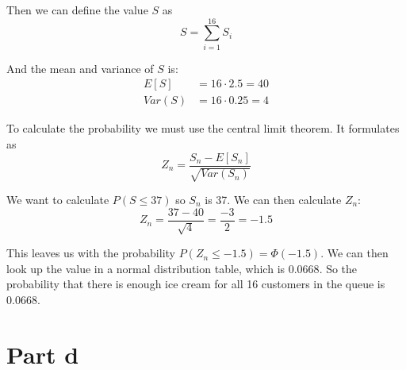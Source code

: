 Then we can define the value $S$ as
\[
	S = \sum^16_{i=1} S_i
\]

And the mean and variance of $S$ is:
\begin{align*}
	E[S]   & = 16 \cdot 2.5 = 40 \\
	Var(S) & = 16 \cdot 0.25 = 4
\end{align*}

To calculate the probability we must use the central limit theorem. It formulates as
\[
	Z_n = \frac{S_n - E[S_n]}{\sqrt{Var(S_n)}}
\]

We want to calculate $P(S\leq 37)$ so $S_n$ is 37. We can then calculate $Z_n$:
\[
	Z_n = \frac{37 - 40}{\sqrt{4}} = \frac{-3}{2} = -1.5
\]

This leaves us with the probability $P(Z_n \leq -1.5) = \Phi(-1.5)$. We can then look up the value in a normal distribution table, which is $0.0668$. So the probability that there is enough ice cream for all 16 customers in the queue is $0.0668$.

\section{Part d}
